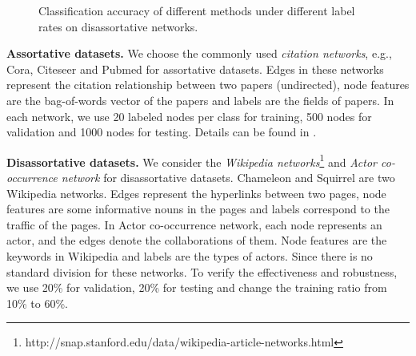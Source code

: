 \documentclass[letterpaper]{article} %
\begin{document}
\begin{figure}
\centering
{}
\caption{Classification accuracy of different methods under different label rates on disassortative networks.}
\label{disassortative}
\end{figure}

\textbf{Assortative datasets.} We choose the commonly used \emph{citation networks}, e.g., Cora, Citeseer and Pubmed for assortative datasets. Edges in these networks represent the citation relationship between two papers (undirected), node features are the bag-of-words vector of the papers and labels are the fields of papers. In each network, we use 20 labeled nodes per class for training, 500 nodes for validation and 1000 nodes for testing. Details can be found in \cite{GCN}.

\noindent
\textbf{Disassortative datasets.} We consider the \emph{Wikipedia networks}\footnote{http://snap.stanford.edu/data/wikipedia-article-networks.html} and \emph{Actor co-occurrence network} \cite{actornet} for disassortative datasets.
Chameleon and Squirrel are two Wikipedia networks. Edges represent the hyperlinks between two pages, node features are some informative nouns in the pages and labels correspond to the traffic of the pages.
In Actor co-occurrence network, each node represents an actor, and the edges denote the collaborations of them. Node features are the keywords in Wikipedia and labels are the types of actors.
Since there is no standard division for these networks. To verify the effectiveness and robustness, we use 20\% for validation, 20\% for testing and change the training ratio from 10\% to 60\%.
\end{document}
